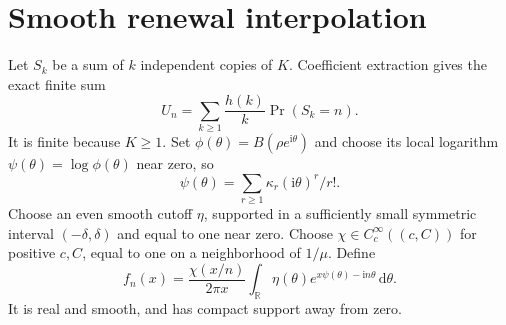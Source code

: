 \documentclass[11pt]{article}
\theoremstyle{definition}\newtheorem{definition}[theorem]{Definition}
\theoremstyle{remark}\newtheorem{remark}[theorem]{Remark}
\newcommand{\ii}{\mathrm i}
\newcommand{\dd}{\,\mathrm d}
\newcommand{\RR}{\mathbb R}
\begin{document}
\section{Smooth renewal interpolation}\label{dep:hl:sec:schwartz}
Let $S_k$ be a sum of $k$ independent copies of $K$. Coefficient
extraction gives the exact finite sum
\begin{equation}\label{dep:hl:eq:renewal}
 U_n=\sum_{k\ge1}\frac{h(k)}k\Pr(S_k=n).
\end{equation}
It is finite because $K\ge1$. Set
$\phi(\theta)=B(\rho e^{\ii\theta})$ and choose its local logarithm
$\psi(\theta)=\log\phi(\theta)$ near zero, so
\[
 \psi(\theta)=\sum_{r\ge1}\kappa_r(\ii\theta)^r/r!.
\]
Choose an even smooth cutoff $\eta$, supported in a sufficiently small
symmetric interval $(-\delta,\delta)$ and equal to one near zero.
Choose $\chi\in C_c^\infty((c,C))$ for positive $c,C$, equal to one
on a neighborhood of $1/\mu$. Define
\begin{equation}\label{dep:hl:eq:fn}
 f_n(x)=\frac{\chi(x/n)}{2\pi x}
    \int_\RR\eta(\theta)e^{x\psi(\theta)-\ii n\theta}\dd\theta.
\end{equation}
It is real and smooth, and has compact support away from zero.
\end{document}

